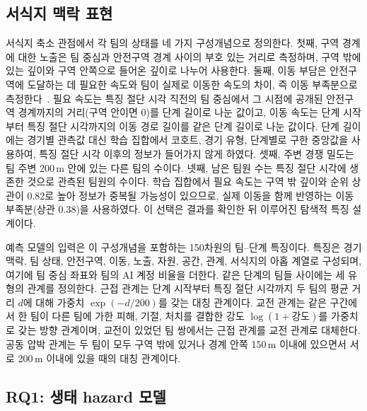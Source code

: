 \subsection{서식지 맥락 표현}
\label{sec:method:representation}

서식지 축소 관점에서 각 팀의 상태를 네 가지 구성개념으로 정의한다.
첫째, 구역 경계에 대한 노출은 팀 중심과 안전구역 경계 사이의 부호 있는 거리로 측정하며, 구역 밖에 있는 깊이와 구역 안쪽으로 들어온 깊이로 나누어 사용한다.
둘째, 이동 부담은 안전구역에 도달하는 데 필요한 속도와 팀이 실제로 이동한 속도의 차이, 즉 이동 부족분으로 측정한다~\cite{Nathan08}.
필요 속도는 특징 절단 시각 직전의 팀 중심에서 그 시점에 공개된 안전구역 경계까지의 거리(구역 안이면 0)를 단계 길이로 나눈 값이고, 이동 속도는 단계 시작부터 특징 절단 시각까지의 이동 경로 길이를 같은 단계 길이로 나눈 값이다.
단계 길이에는 경기별 관측값 대신 학습 집합에서 코호트, 경기 유형, 단계별로 구한 중앙값을 사용하여, 특징 절단 시각 이후의 정보가 들어가지 않게 하였다.
셋째, 주변 경쟁 밀도는 팀 주변 200\,m 안에 있는 다른 팀의 수이다.
넷째, 남은 팀원 수는 특징 절단 시각에 생존한 것으로 관측된 팀원의 수이다.
학습 집합에서 필요 속도는 구역 밖 깊이와 순위 상관이 0.82로 높아 정보가 중복될 가능성이 있으므로, 실제 이동을 함께 반영하는 이동 부족분(상관 0.38)을 사용하였다.
이 선택은 결과를 확인한 뒤 이루어진 탐색적 특징 설계이다.

예측 모델의 입력은 이 구성개념을 포함하는 150차원의 팀--단계 특징이다.
특징은 경기 맥락, 팀 상태, 안전구역, 이동, 노출, 자원, 공간, 관계, 서식지의 아홉 계열로 구성되며, 여기에 팀 중심 좌표와 팀의 AI 계정 비율을 더한다.
같은 단계의 팀들 사이에는 세 유형의 관계를 정의한다.
근접 관계는 단계 시작부터 특징 절단 시각까지 두 팀의 평균 거리 $d$에 대해 가중치 $\exp(-d/200)$를 갖는 대칭 관계이다.
교전 관계는 같은 구간에서 한 팀이 다른 팀에 가한 피해, 기절, 처치를 결합한 강도 $\log(1+\text{강도})$를 가중치로 갖는 방향 관계이며, 교전이 있었던 팀 쌍에서는 근접 관계를 교전 관계로 대체한다.
공동 압박 관계는 두 팀이 모두 구역 밖에 있거나 경계 안쪽 150\,m 이내에 있으면서 서로 200\,m 이내에 있을 때의 대칭 관계이다.

\subsection{RQ1: 생태 hazard 모델}
\label{sec:method:rq1}


